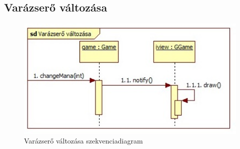 \subsection{Varázserő változása}
\begin{figure}[H]
\begin{center}
\includegraphics[width=17cm]{chapters/chapter11/images/Varazsero_valtozasa.jpg}
\caption{Varázserő változása szekvenciadiagram}
\label{fig:Varazsero_valtozasa}
\end{center}
\end{figure}










